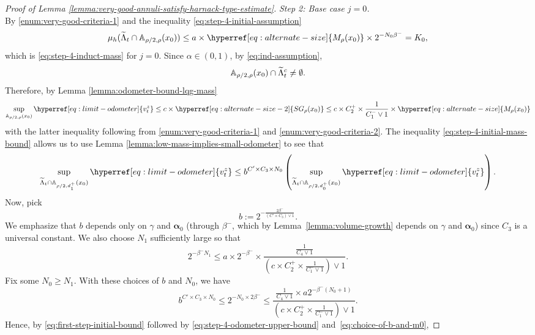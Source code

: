 \documentclass[12pt]{amsart}
\numberwithin{equation}{section}
\newcommand{\odometer}[2]{\hyperref[eq:limit-odometer]{v^{#1}_{#2}}}
\newcommand{\Mrho}[2]{\hyperref[eq:alternate-size]{M_{#1}(#2)}}
\newcommand{\SGrho}[2]{\hyperref[eq:alternate-size-2]{SG_{#1}(#2)}}
\begin{document}
\begin{proof}[Proof of Lemma \ref{lemma:very-good-annuli-satisfy-harnack-type-estimate}]
		{\it Step 2: Base case $j = 0$.} \\
		By \ref{enum:very-good-criteria-1} and the inequality \eqref{eq:step-4-initial-assumption} 
		\begin{equation} \label{eq:step-4-initial-mass-bound}
		\mu_h(\widetilde \Lambda_t \cap \A_{\rho/2, \rho}(x_0)) \leq a \times \Mrho{\rho}{x_0} \times 2^{-N_0 \beta^-}  = K_0,
		\end{equation}
		which is \eqref{eq:step-4-induct-mass} for $j = 0$.
		Since $\alpha \in (0,1)$, by \eqref{eq:ind-assumption},
		\[
		\mathbb{A}_{\rho/2, \rho}(x_0) \cap \widetilde{\Lambda}_t^c \neq \emptyset.
		\]
		Therefore, by Lemma 
		\ref{lemma:odometer-bound-lqg-mass}
		\begin{equation} \label{eq:step-4-odometer-upper-bound}
		\sup_{\A_{\rho/2, \rho}(x_0)} \odometer{z}{t} \leq c \times \SGrho{\rho}{x_0} 	\leq c \times C^+_2 \times \frac{1}{C^-_1 \vee 1} \times \Mrho{\rho}{x_0} 
		\end{equation}
		with the latter inequality following from \ref{enum:very-good-criteria-1} and \ref{enum:very-good-criteria-2}. The inequality \eqref{eq:step-4-initial-mass-bound} allows us to use Lemma \ref{lemma:low-mass-implies-small-odometer}
		to see that 
		\begin{equation} \label{eq:first-step-initial-bound}
		\sup_{\widetilde \Lambda_t \cap \A_{\rho/2, d^+_{1}}(x_0)} \odometer{z}{t} \leq b^{C' \times C_3 \times N_0} \left(	\sup_{\widetilde \Lambda_t \cap \A_{\rho/2, d^+_{0}}(x_0)} \odometer{z}{t} \right).
		\end{equation}
		Now, pick  
		\begin{equation} \label{eq:choice-of-b}
		b := 2^{-\frac{2 \beta^-}{(C' \times C_3) \vee 1}}  .
		\end{equation}
		We emphasize that $b$ depends only on $\gamma$ and $\boldsymbol{\alpha}_0$ (through $\beta^-$, which by Lemma~\ref{lemma:volume-growth} depends on $\gamma$ and $\boldsymbol{\alpha}_0$) since $C_3$ is a universal constant.
		We also choose $N_1$ sufficiently large so that
		\begin{equation} \label{eq:choice-of-N1}
		2^{-\beta^- N_1} \leq a \times 2^{-\beta^-} \times \frac{\frac{1}{C_4 \vee 1}}{(c \times C^+_2 \times \frac{1}{C^-_1 \vee 1}) \vee 1}.
		\end{equation}
		Fix some $N_0 \geq N_1$. With these choices of $b$ and $N_0$, we have 
		\begin{equation} \label{eq:choice-of-b-and-m0}
		b^{C' \times C_3 \times N_0} \leq 
		2^{-N_0 \times 2 \beta^-} \leq
		\frac{ \frac{1}{C_4 \vee 1} \times a 2^{-\beta^-(N_0+1)}}{(c \times C^+_2 \times \frac{1}{C^-_1 \vee 1}) \vee 1}.
		\end{equation}
		Hence, by \eqref{eq:first-step-initial-bound} followed by \eqref{eq:step-4-odometer-upper-bound} and~\eqref{eq:choice-of-b-and-m0}, 
		

\end{proof}
\end{document}
